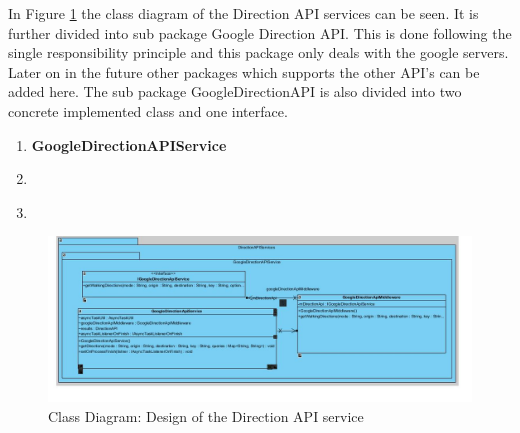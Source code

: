         \par
           In Figure \ref{fig:directionServiceClassDiagram} the class diagram
           of the Direction API services can be seen. It is further divided into
           sub package Google Direction API. This is done following the single
           responsibility principle and this package only deals with the google
           servers. Later on in the future other packages which supports the other
           API's can be added here.
           The sub package GoogleDirectionAPI is also divided into two concrete
           implemented class  and one interface.
           \begin{enumerate}
               \item 
                \textbf{GoogleDirectionAPIService}

               \item \textbf{}
               \item \textbf{}
           \end{enumerate} 

        \begin{figure}[htbp!]
            \centering \includegraphics[scale=0.6]{grafiken/directionService.jpg}
            \caption{Class Diagram: Design of the Direction API service}
            \label{fig:directionServiceClassDiagram}
        \end{figure}